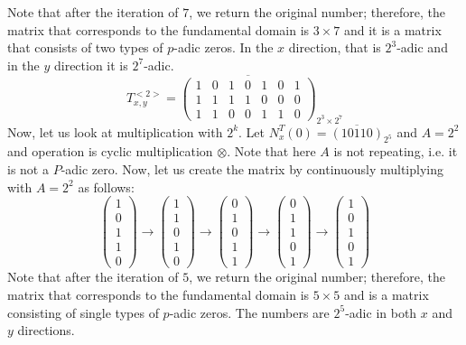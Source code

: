 \documentclass[times,twocolumn,final]{elsarticle}
\begin{document}
Note that after the iteration of $7$, we return the original number; therefore, the matrix that corresponds to the fundamental domain is $3\times7$ and it is a matrix that consists of two types of $p$-adic zeros. In the $x$ direction, that is $2^3$-adic and in the $y$ direction it is $2^7$-adic. 
$$ 
T_{x,y}^{<2>}= \overline{\begin{pmatrix}1&0&1&0&1&0&1\\ 1&1&1&1&0&0&0\\ 1&1&0&0&1&1&0 \end{pmatrix}}_{2^3 \times 2^7}
$$
Now, let us look at multiplication with $2^k$. Let $N^T_x(0) = \overline{(10110)}_{2^5}$ and $A=2^2$ and operation is cyclic multiplication $\otimes$. Note that here $A$ is not repeating, i.e. it is not a $P$-adic zero. 
Now, let us create the matrix by continuously multiplying with $A=2^2$ as follows: 
$$ 
\begin{pmatrix}1\\0\\1\\1\\0 \end{pmatrix} \rightarrow 
\begin{pmatrix}1\\1\\0\\1\\0 \end{pmatrix} \rightarrow 
\begin{pmatrix}0\\1\\0\\1\\1 \end{pmatrix} \rightarrow 
\begin{pmatrix}0\\1\\1\\0\\1 \end{pmatrix} \rightarrow 
\begin{pmatrix}1\\0\\1\\0\\1 \end{pmatrix}  
$$
Note that after the iteration of $5$, we return the original number; therefore, the matrix that corresponds to the fundamental domain is $5\times5$ and is a matrix consisting of single types of $p$-adic zeros. The numbers are $2^5$-adic in both $x$ and $y$ directions. 
\end{document}
